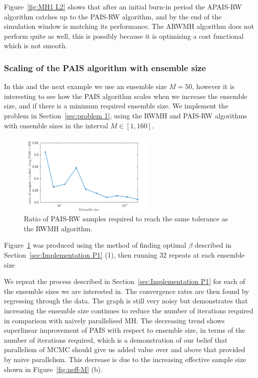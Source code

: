 \documentclass[final]{siamltex}
\begin{document}
Figure~\ref{fig:MH1 L2} shows that after an initial burn-in
period the APAIS-RW algorithm catches up to the PAIS-RW algorithm, and
by the end of the simulation window is matching its performance. The
ARWMH algorithm does not perform quite as well, this is possibly because
it is optimising a cost functional which is not smooth.


\subsubsection{Scaling of the PAIS algorithm with ensemble size}

In this and the next example we use an ensemble size $M=50$, however it is
interesting to see how the PAIS algorithm scales when we increase the
ensemble size, and if there is a minimum required ensemble size. We
implement the problem in Section~\ref{sec:problem 1}, using
the RWMH and PAIS-RW algorithms with ensemble sizes in the interval $M
\in [1, 160]$.

\begin{figure}[ht]
\begin{center}
\includegraphics[width=0.6\textwidth]{"figures/PAIS_saving"}
\caption{Ratio of PAIS-RW samples required to reach the same tolerance as the RWMH algorithm.}
\label{fig:PAIS_saving}
\end{center}
\end{figure}

Figure~\ref{fig:PAIS_saving} was produced using the method of finding
optimal $\beta$ described in Section~\ref{sec:Implementation P1} (1),
then running 32 repeats at each ensemble size

We repeat the process described in Section~\ref{sec:Implementation P1}
for each of the ensemble sizes we are interested in. The convergence rates
are then found by regressing through the data. The graph is still very
noisy but demonstrates that increasing the ensemble size continues to
reduce the number of iterations required in comparison with naively
parallelised MH. The decreasing trend shows superlinear improvement of
PAIS with respect to ensemble size, in terms of the number of
iterations required, which is a demonstration of our belief that
parallelism of MCMC should give us added value over and above that
provided by naive parallelism. This decrease is due to the increasing
effective sample size shown in Figure~\ref{fig:neff-M} (b).
\end{document}
